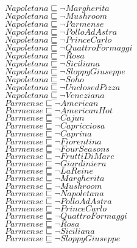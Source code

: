 \documentclass[a4paper,10pt]{article}
\begin{document}
 $Napoletana \sqsubseteq  \lnot Margherita$\\ 
 $Napoletana \sqsubseteq  \lnot Mushroom$\\ 
 $Napoletana \sqsubseteq  \lnot Parmense$\\ 
 $Napoletana \sqsubseteq  \lnot PolloAdAstra$\\ 
 $Napoletana \sqsubseteq  \lnot PrinceCarlo$\\ 
 $Napoletana \sqsubseteq  \lnot QuattroFormaggi$\\ 
 $Napoletana \sqsubseteq  \lnot Rosa$\\ 
 $Napoletana \sqsubseteq  \lnot Siciliana$\\ 
 $Napoletana \sqsubseteq  \lnot SloppyGiuseppe$\\ 
 $Napoletana \sqsubseteq  \lnot Soho$\\ 
 $Napoletana \sqsubseteq  \lnot UnclosedPizza$\\ 
 $Napoletana \sqsubseteq  \lnot Veneziana$\\ 
 $Parmense \sqsubseteq  \lnot American$\\ 
 $Parmense \sqsubseteq  \lnot AmericanHot$\\ 
 $Parmense \sqsubseteq  \lnot Cajun$\\ 
 $Parmense \sqsubseteq  \lnot Capricciosa$\\ 
 $Parmense \sqsubseteq  \lnot Caprina$\\ 
 $Parmense \sqsubseteq  \lnot Fiorentina$\\ 
 $Parmense \sqsubseteq  \lnot FourSeasons$\\ 
 $Parmense \sqsubseteq  \lnot FruttiDiMare$\\ 
 $Parmense \sqsubseteq  \lnot Giardiniera$\\ 
 $Parmense \sqsubseteq  \lnot LaReine$\\ 
 $Parmense \sqsubseteq  \lnot Margherita$\\ 
 $Parmense \sqsubseteq  \lnot Mushroom$\\ 
 $Parmense \sqsubseteq  \lnot Napoletana$\\ 
 $Parmense \sqsubseteq  \lnot PolloAdAstra$\\ 
 $Parmense \sqsubseteq  \lnot PrinceCarlo$\\ 
 $Parmense \sqsubseteq  \lnot QuattroFormaggi$\\ 
 $Parmense \sqsubseteq  \lnot Rosa$\\ 
 $Parmense \sqsubseteq  \lnot Siciliana$\\ 
 $Parmense \sqsubseteq  \lnot SloppyGiuseppe$\\ 
\end{document}
